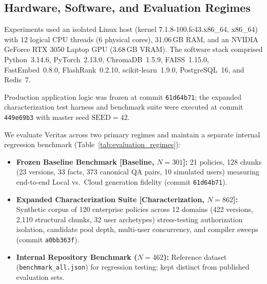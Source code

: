 \documentclass[journal]{IEEEtran}
\newcommand{\sys}{Veritas}
\begin{document}
\subsection{Hardware, Software, and Evaluation Regimes}
Experiments used an isolated Linux host (kernel 7.1.8-100.fc43.x86\_64, x86\_64) with 12 logical CPU threads (6 physical cores), 31.06\,GB RAM, and an NVIDIA GeForce RTX 3050 Laptop GPU (3.68\,GB VRAM). The software stack comprised Python~3.14.6, PyTorch~2.13.0, ChromaDB~1.5.9, FAISS~1.15.0, FastEmbed~0.8.0, FlashRank~0.2.10, scikit-learn~1.9.0, PostgreSQL~16, and Redis~7.

Production application logic was frozen at commit \texttt{61d64b71}; the expanded characterization test harness and benchmark suite were executed at commit \texttt{449e69b3} with master seed $\text{SEED}=42$.

We evaluate \sys{} across two primary regimes and maintain a separate internal regression benchmark (Table~\ref{tab:evaluation_regimes}):
\begin{itemize}\setlength{\itemsep}{0pt}\setlength{\parsep}{0pt}\setlength{\topsep}{0.5pt}
  \item \textbf{Frozen Baseline Benchmark [Baseline, $N=301$]:} 21 policies, 128 chunks (23 versions, 33 facts, 373 canonical QA pairs, 10 simulated users) measuring end-to-end Local vs.\ Cloud generation fidelity (commit \texttt{61d64b71}).
  \item \textbf{Expanded Characterization Suite [Characterization, $N=862$]:} Synthetic corpus of 120 enterprise policies across 12 domains (422 versions, 2,110 structural chunks, 32 user archetypes) stress-testing authorization isolation, candidate pool depth, multi-user concurrency, and compiler sweeps (commit \texttt{a0bb363f}).
  \item \textbf{Internal Repository Benchmark ($N=462$):} Reference dataset (\texttt{benchmark\_}\allowbreak\texttt{all.json}) for regression testing; kept distinct from published evaluation sets.
\end{itemize}
\end{document}
